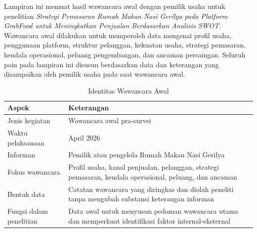 \label{app:wawancara-awal-pemilik}

Lampiran ini memuat hasil wawancara awal dengan pemilik usaha untuk penelitian \textit{Strategi Pemasaran Rumah Makan Nasi Gerilya pada Platform GrabFood untuk Meningkatkan Penjualan Berdasarkan Analisis SWOT}. Wawancara awal dilakukan untuk memperoleh data mengenai profil usaha, penggunaan platform, struktur pelanggan, kekuatan usaha, strategi pemasaran, kendala operasional, peluang pengembangan, dan ancaman persaingan. Seluruh poin pada lampiran ini disusun berdasarkan data dan keterangan yang disampaikan oleh pemilik usaha pada saat wawancara awal.

\begin{table}[!htbp]
    \centering
    \caption{Identitas Wawancara Awal}
    \label{tab:identitas_wawancara_awal}
    \begin{tabularx}{\textwidth}{|J|Y|}
        \toprule
        \textbf{Aspek}             & \textbf{Keterangan}                                                                                       \\ \hline
        \midrule
        Jenis kegiatan             & Wawancara awal pra-survei                                                                                 \\ \hline
        Waktu pelaksanaan          & April 2026                                                                                                \\ \hline
        Informan                   & Pemilik atau pengelola Rumah Makan Nasi Gerilya                                                           \\ \hline
        Fokus wawancara            & Profil usaha, kanal penjualan, pelanggan, strategi pemasaran, kendala operasional, peluang, dan ancaman   \\ \hline
        Bentuk data                & Catatan wawancara yang diringkas dan diolah peneliti tanpa mengubah substansi keterangan informan         \\ \hline
        Fungsi dalam penelitian    & Data awal untuk menyusun pedoman wawancara utama dan memperkuat identifikasi faktor internal-eksternal    \\ \hline
        \bottomrule
    \end{tabularx}
\end{table}

